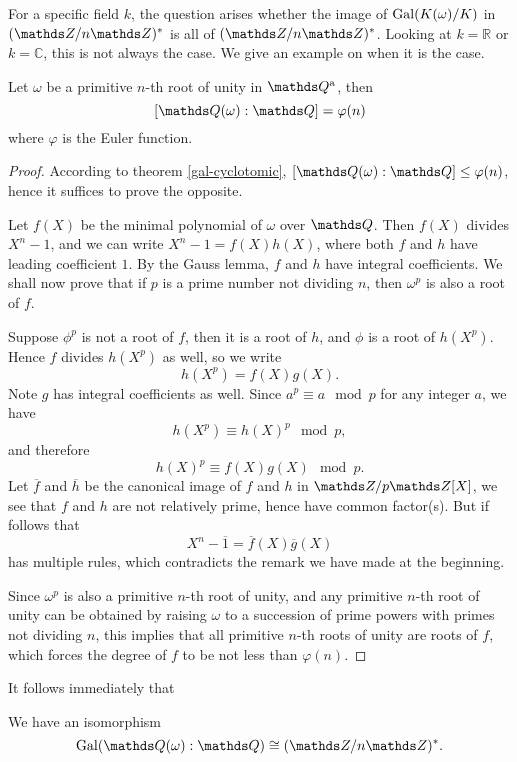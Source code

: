 				For a specific field $k$, the question arises whether the image of $\operatorname{Gal}(K(\omega)/K)$ in $(\Z/n\Z)^\ast$ is all of $(\Z/n\Z)^\ast$. Looking at $k=\mathds{R}$ or $k=\mathds{C}$, this is not always the case. We give an example on when it is the case.
				\begin{theorem}
					Let $\omega$ be a primitive $n$-th root of unity in $\Q^\mathrm{a}$, then
					\[
						[\Q(\omega):\Q] = \varphi(n)
					\]
					where $\varphi$ is the Euler function.
				\end{theorem}
				\begin{proof}
					According to theorem \ref{gal-cyclotomic}, $[\Q(\omega):\Q] \le \varphi(n)$, hence it suffices to prove the opposite.
					
					Let $f(X)$ be the minimal polynomial of $\omega$ over $\Q$. Then $f(X)$ divides $X^n-1$, and we can write $X^n-1=f(X)h(X)$, where both $f$ and $h$ have leading coefficient $1$. By the Gauss lemma, $f$ and $h$ have integral coefficients. We shall now prove that if $p$ is a prime number not dividing $n$, then $\omega^p$ is also a root of $f$.
					
					Suppose $\phi^p$ is not a root of $f$, then it is a root of $h$, and $\phi$ is a root of $h(X^p)$. Hence $f$ divides $h(X^p)$ as well, so we write
					\[
						h(X^p)=f(X)g(X).
					\]
					Note $g$ has integral coefficients as well. Since $a^p \equiv a \mod p$ for any integer $a$, we have
					\[
						h(X^p) \equiv h(X)^p \mod p,
					\]
					and therefore
					\[
						h(X)^p \equiv f(X)g(X) \mod p.
					\]
					Let $\overline{f}$ and $\overline{h}$ be the canonical image of $f$ and $h$ in $\Z/p\Z[X]$, we see that $f$ and $h$ are not relatively prime, hence have common factor(s). But if follows that
					\[
						X^n-\overline{1}=\overline{f}(X)\overline{g}(X)
					\]
					has multiple rules, which contradicts the remark we have made at the beginning.
					
					Since $\omega^p$ is also a primitive $n$-th root of unity, and any primitive $n$-th root of unity can be obtained by raising $\omega$ to a succession of prime powers with primes not dividing $n$, this implies that all primitive $n$-th roots of unity are roots of $f$, which forces the degree of $f$ to be not less than $\varphi(n).$
					
				\end{proof}
			
				It follows immediately that
			
				\begin{corollary}
					We have an isomorphism
					\[
						\gal(\Q(\omega):\Q) \cong (\Z/n\Z)^\ast.
					\]
				\end{corollary}
			
